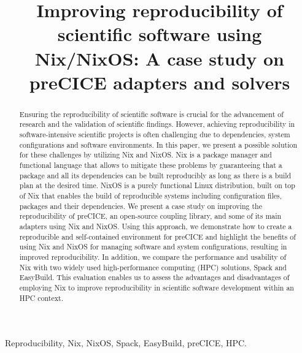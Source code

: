 \documentclass[conference,final,a4paper]{IEEEtran}
\begin{document}
\title{Improving reproducibility of scientific software using Nix/NixOS: A case study on preCICE adapters and solvers}

\author{
\and
{}
}

\maketitle

\begin{abstract}
  Ensuring the reproducibility of scientific software is crucial for the advancement of research and the validation of scientific findings.
  However, achieving reproducibility in software-intensive scientific projects is often challenging due to dependencies, system configurations and software environments.
  In this paper, we present a possible solution for these challenges by utilizing Nix and NixOS.
  Nix is a package manager and functional language that allows to mitigate these problems by guaranteeing that a package and all its dependencies can be built reproducibly as long as there is a build plan at the desired time.
  NixOS is a purely functional Linux distribution, built on top of Nix that enables the build of reproducible systems including configuration files, packages and their dependencies.
  We present a case study on improving the reproducibility of preCICE, an open-source coupling library, and some of its main adapters using Nix and NixOS.
  Using this approach, we demonstrate how to create a reproducible and self-contained environment for preCICE and highlight the benefits of using Nix and NixOS for managing software and system configurations, resulting in improved reproducibility.
  In addition, we compare the performance and usability of Nix with two widely used high-performance computing (HPC) solutions, Spack and EasyBuild.
  This evaluation enables us to assess the advantages and disadvantages of employing Nix to improve reproducibility in scientific software development within an HPC context.
\end{abstract}

\begin{IEEEkeywords}
  Reproducibility, Nix, NixOS, Spack, EasyBuild, preCICE, HPC.
\end{IEEEkeywords}
\end{document}
